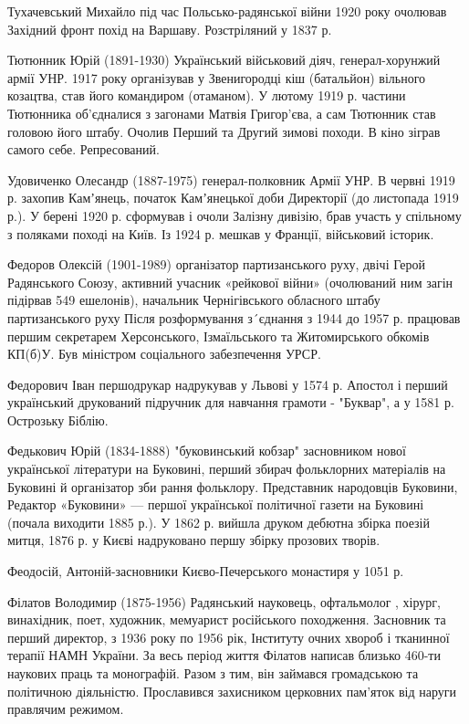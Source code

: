 Тухачевський Михайло під час Польсько-радянської війни 1920 року очолював Західний фронт похід на Варшаву. Розстріляний у 1837 р.

Тютюнник Юрій (1891-1930) Український військовий діяч, генерал-хорунжий армії УНР. 1917 року організував у Звенигородці кіш (батальйон) вільного козацтва, став його командиром (отаманом). У лютому 1919 р. частини Тютюнника об’єдналися з загонами Матвія Григор’єва, а сам Тютюнник став головою його штабу. Очолив Перший та Другий зимові походи. В кіно зіграв самого себе. Репресований.

Удовиченко Олесандр (1887-1975) генерал-полковник Армії УНР.  В червні 1919 р. захопив Камʼянець, початок Камʼянецької доби Директорії (до листопада 1919 р.).  У берені 1920 р. сформував і очоли Залізну дивізію, брав участь у спільному з поляками поході на Київ. Із 1924 р. мешкав у Франції, військовий історик.

 Федоров Олексій (1901-1989) організатор партизанського руху, двічі Герой Радянського Союзу, активний учасник «рейкової війни» (очолюваний ним загін підірвав 549 ешелонів), начальник Чернігівського обласного штабу партизанського руху Після розформування з´єднання з 1944 до 1957 р. працював першим секретарем Херсонського, Ізмаїльського та Житомирського обкомів КП(б)У. Був міністром соціального забезпечення УРСР.

Федорович Іван  першодрукар надрукував у Львові у 1574 р. Апостол і перший український друкований підручник для навчання грамоти - "Буквар", а у 1581 р. Острозьку Біблію.

Федькович Юрій  (1834-1888) "буковинський кобзар" засновником нової української літератури на Буковині, перший збирач фольклорних матеріалів на Буковині й організатор зби рання фольклору. Представник народовців Буковини, Редактор «Буковини» --- першої української політичної газети на Буковині (почала виходити 1885 р.). У 1862 р. вийшла друком дебютна збірка поезій митця, 1876 р. у Києві надруковано першу збірку прозових творів.

Феодосій, Антоній-засновники Києво-Печерського монастиря у 1051 р.

Філатов Володимир (1875-1956) Радянський науковець, офтальмолог , хірург, винахідник, поет, художник, мемуарист російського походження. Засновник та перший директор, з 1936 року по 1956 рік, Інституту очних хвороб і тканинної терапії НАМН України. За весь період життя Філатов написав близько 460-ти наукових праць та монографій. Разом з тим, він займався громадською та політичною діяльністю. Прославився захисником церковних пам’яток від наруги правлячим режимом.

